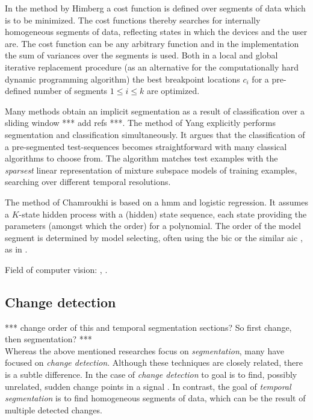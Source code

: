 In the method by Himberg \etal \cite{himberg2001time} a cost function is defined over segments of data which is to be minimized.
The cost functions thereby searches for internally homogeneous segments of data, reflecting states in which the devices and the user are.
The cost function can be any arbitrary function and in the implementation the sum of variances over the segments is used.
Both in a local and global iterative replacement procedure (as an alternative for the computationally hard dynamic programming algorithm) the best breakpoint locations $c_i$ for a pre-defined number of segments $1 \leq i \leq k$ are optimized.

Many methods obtain an implicit segmentation as a result of classification over a sliding window *** add refs ***.
The method of Yang \etal \cite{yang2008distributed} explicitly performs segmentation and classification simultaneously.
It argues that the classification of a pre-segmented test-sequences becomes straightforward with many classical algorithms to choose from.
The algorithm matches test examples with the \emph{sparsest} linear representation of mixture subspace models of training examples, searching over different temporal resolutions.

The method of Chamroukhi \etal \cite{chamroukhi2013joint} is based on a \gls{hmm} and logistic regression.
It assumes a $K$-state hidden process with a (hidden) state sequence, each state providing the parameters (amongst which the order) for a polynomial.
The order of the model segment is determined by model selecting, often using the \gls{bic} or the similar \gls{aic} \cite{akaike1974new}, as in \cite{he2008activity}.

Field of computer vision: \cite{zhou2008aligned}, \cite{li2007segmentation}.

\subsection{Change detection}\label{subsec:change_detection}
*** change order of this and temporal segmentation sections? So first change, then segmentation? *** \\
Whereas the above mentioned researches focus on \emph{segmentation}, many have focused on \emph{change detection}.
Although these techniques are closely related, there is a subtle difference.
In the case of \emph{change detection} to goal is to find, possibly unrelated, sudden change points in a signal \cite{takeuchi2006unifying}.
In contrast, the goal of \emph{temporal segmentation} is to find homogeneous segments of data, which can be the result of multiple detected changes.

